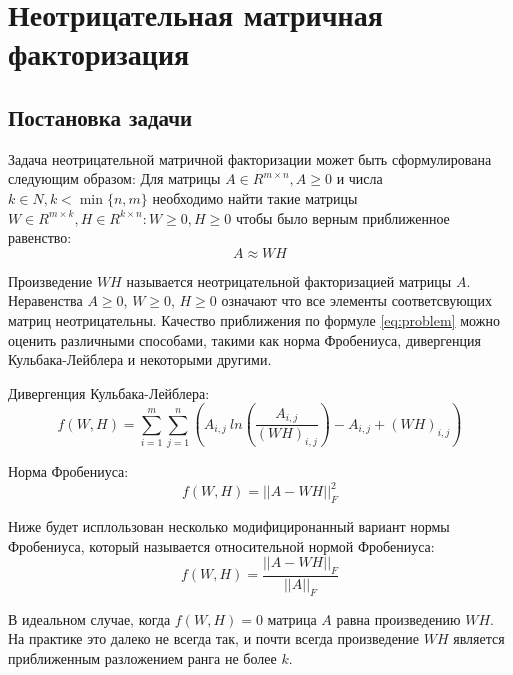 
\chapter{Неотрицательная матричная факторизация}





\section{Постановка задачи}

Задача неотрицательной матричной факторизации может быть сформулирована следующим образом:
Для матрицы $A \in R^{m \times n}, A \geq 0$ и числа $k \in N, k < \min\{n, m\}$
необходимо найти  такие матрицы $W \in R^{m \times k}, H \in R^{k \times n} : W \geq 0, H \geq 0$ чтобы было верным приближенное равенство:
\begin{equation} \label{eq:problem}
  A \approx W H
\end{equation}

Произведение $WH$ называется неотрицательной факторизацией матрицы $A$. Неравенства $A \geq 0$, $W \geq 0$, $H \geq 0$ означают что все элементы соответсвующих матриц неотрицательны.
Качество приближения по формуле \eqref{eq:problem} можно оценить различными способами, такими как норма Фробениуса,
дивергенция Кульбака-Лейблера и некоторыми другими.

Дивергенция Кульбака-Лейблера:
\begin{equation*}
  f(W, H) =
    \sum_{i=1}^m \sum_{j=1}^n
    \left(
      A_{i,j} \
      ln\left(
        \frac{A_{i,j}}{(WH)_{i,j}}
      \right)
      - A_{i,j}
      + (WH)_{i,j}
    \right)
\end{equation*}

Норма Фробениуса:
\begin{equation*}
  f(W, H) = || A - WH ||^2_F
\end{equation*}

Ниже будет исплользован несколько модифициронанный вариант нормы Фробениуса,
который называется относительной нормой Фробениуса:
\begin{equation} \label{eq:frob_norm}
  f(W, H) = \dfrac{||A - WH||_F}{|| A ||_F}
\end{equation}

В идеальном случае, когда $f(W,H)=0$ матрица $A$ равна произведению $WH$.
На практике это далеко не всегда так, и почти всегда произведение $WH$ является приближенным разложением ранга не более $k$.

